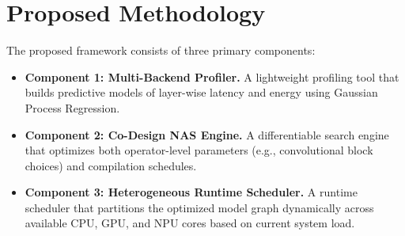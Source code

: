 \section{Proposed Methodology}
The proposed framework consists of three primary components:
\begin{itemize}
    \item \textbf{Component 1: Multi-Backend Profiler.} A lightweight profiling tool that builds predictive models of layer-wise latency and energy using Gaussian Process Regression.
    \item \textbf{Component 2: Co-Design NAS Engine.} A differentiable search engine that optimizes both operator-level parameters (e.g., convolutional block choices) and compilation schedules.
    \item \textbf{Component 3: Heterogeneous Runtime Scheduler.} A runtime scheduler that partitions the optimized model graph dynamically across available CPU, GPU, and NPU cores based on current system load.
\end{itemize}
